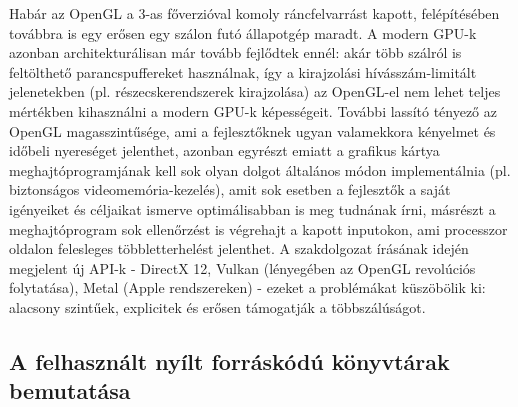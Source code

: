 Habár az OpenGL a 3-as főverzióval komoly ráncfelvarrást kapott, felépítésében továbbra is egy erősen egy szálon futó állapotgép maradt. A modern GPU-k azonban architekturálisan már tovább fejlődtek ennél: akár több szálról is feltölthető parancspuffereket használnak, így a kirajzolási hívásszám-limitált jelenetekben (pl. részecskerendszerek kirajzolása) az OpenGL-el nem lehet teljes mértékben kihasználni a modern GPU-k képességeit. További lassító tényező az OpenGL magasszintűsége, ami a fejlesztőknek ugyan valamekkora kényelmet és időbeli nyereséget jelenthet, azonban egyrészt emiatt a grafikus kártya meghajtóprogramjának kell sok olyan dolgot általános módon implementálnia (pl. biztonságos videomemória-kezelés), amit sok esetben a fejlesztők a saját igényeiket és céljaikat ismerve optimálisabban is meg tudnának írni, másrészt a meghajtóprogram sok ellenőrzést is végrehajt a kapott inputokon, ami processzor oldalon felesleges többletterhelést jelenthet. A szakdolgozat írásának idején megjelent új API-k - DirectX 12, Vulkan (lényegében az OpenGL revolúciós folytatása), Metal (Apple rendszereken) - ezeket a problémákat küszöbölik ki: alacsony szintűek, explicitek és erősen támogatják a többszálúságot.

\subsection{A felhasznált nyílt forráskódú könyvtárak bemutatása}

